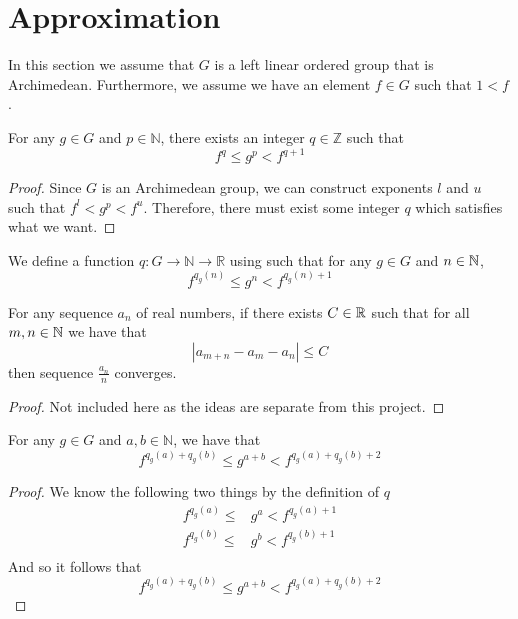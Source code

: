 \section{Approximation}
In this section we assume that $G$ is a left linear ordered group
that is Archimedean. Furthermore, we assume we have an element $f\in G$
such that $1 < f$.
\begin{theorem}\label{approximate}
    \leanok
    For any $g \in G$ and $p \in \mathbb{N}$,
    there exists an integer $q \in \mathbb{Z}$
    such that
    \[
        f^q \le g^p < f^{q+1}
    \]
\end{theorem}
\begin{proof}\leanok
Since $G$ is an Archimedean group, we can construct exponents $l$ and $u$
such that $f^l < g^p < f^u$. Therefore, there must exist some integer $q$
which satisfies what we want.
\end{proof}

\begin{definition}\label{def:q}
    \leanok{}
    We define a function $q \colon G \to \mathbb{N} \to \mathbb{R}$
    using  such that for any $g\in G$ and $n \in \mathbb{N}$,
    \[
        f^{q_g(n)} \le g^n < f^{q_g(n)+1}
    \]
\end{definition}

\begin{theorem}\label{sequence_convergence}
    \leanok
    For any sequence $a_n$ of real numbers,
    if there exists $C \in \mathbb{R}$ such that for all $m,n\in \mathbb{N}$
    we have that
    \[
        |a_{m+n} - a_m - a_n| \le C
    \]
    then sequence $\frac{a_n}{n}$ converges.
\end{theorem}
\begin{proof}\leanok
Not included here as the ideas
are separate from this project.
\end{proof}

\begin{theorem}\label{q_exp_add}
    \leanok{}
    For any $g \in G$ and $a,b \in \mathbb{N}$, we have that
    \[
        f^{q_g(a) + q_g(b)} \le g^{a+b} < f^{q_g(a) + q_g(b) + 2}
    \]
\end{theorem}
\begin{proof}\leanok
We know the following two things by the definition of $q$
\begin{align*}
f^{q_g(a)}\le &g^a < f^{q_g(a)+1}\\
f^{q_g(b)}\le &g^b < f^{q_g(b)+1}\\
\end{align*}
And so it follows that
\[
f^{q_g(a)+q_g(b)}\le g^{a+b} < f^{q_g(a)+q_g(b) + 2}
\]
\end{proof}

